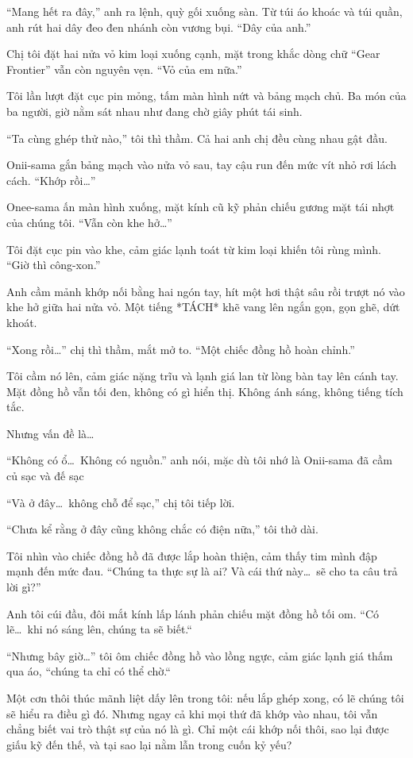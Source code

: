 \documentclass[../main.tex]{subfiles}
\begin{document}
``Mang hết ra đây,'' anh ra lệnh, quỳ gối xuống sàn. Từ túi áo khoác và túi quần, anh rút hai dây đeo đen nhánh còn vương bụi. ``Dây của anh.''

Chị tôi đặt hai nửa vỏ kim loại xuống cạnh, mặt trong khắc dòng chữ ``Gear Frontier'' vẫn còn nguyên vẹn. ``Vỏ của em nữa.''

Tôi lần lượt đặt cục pin mỏng, tấm màn hình nứt và bảng mạch chủ. Ba món của ba người, giờ nằm sát nhau như đang chờ giây phút tái sinh.

``Ta cùng ghép thử nào,'' tôi thì thầm. Cả hai anh chị đều cùng nhau gật đầu.

Onii-sama gắn bảng mạch vào nửa vỏ sau, tay cậu run đến mức vít nhỏ rơi lách cách. ``Khớp rồi\dots''

Onee-sama ấn màn hình xuống, mặt kính cũ kỹ phản chiếu gương mặt tái nhợt của chúng tôi. ``Vẫn còn khe hở\dots''

Tôi đặt cục pin vào khe, cảm giác lạnh toát từ kim loại khiến tôi rùng mình. ``Giờ thì công-xon.''

Anh cầm mảnh khớp nối bằng hai ngón tay, hít một hơi thật sâu rồi trượt nó vào khe hở giữa hai nửa vỏ. Một tiếng *TÁCH* khẽ vang lên ngắn gọn, gọn ghẽ, dứt khoát.

``Xong rồi\dots'' chị thì thầm, mắt mở to. ``Một chiếc đồng hồ hoàn chỉnh.''

Tôi cầm nó lên, cảm giác nặng trĩu và lạnh giá lan từ lòng bàn tay lên cánh tay. Mặt đồng hồ vẫn tối đen, không có gì hiển thị. Không ánh sáng, không tiếng tích tắc.

Nhưng vấn đề là\dots

``Không có ổ\dots\ Không có nguồn.'' anh nói, mặc dù tôi nhớ là Onii-sama đã cầm củ sạc và đế sạc

``Và ở đây\dots\ không chỗ để sạc,'' chị tôi tiếp lời.

``Chưa kể rằng ở đây cũng không chắc có điện nữa,'' tôi thở dài.

Tôi nhìn vào chiếc đồng hồ đã được lắp hoàn thiện, cảm thấy tim mình đập mạnh đến mức đau. ``Chúng ta thực sự là ai? Và cái thứ này\dots\ sẽ cho ta câu trả lời gì?''

Anh tôi cúi đầu, đôi mắt kính lấp lánh phản chiếu mặt đồng hồ tối om. ``Có lẽ\dots\ khi nó sáng lên, chúng ta sẽ biết.``

``Nhưng bây giờ\dots'' tôi ôm chiếc đồng hồ vào lồng ngực, cảm giác lạnh giá thấm qua áo, ``chúng ta chỉ có thể chờ.``

Một cơn thôi thúc mãnh liệt dấy lên trong tôi: nếu lắp ghép xong, có lẽ chúng tôi sẽ hiểu ra điều gì đó. Nhưng ngay cả khi mọi thứ đã khớp vào nhau, tôi vẫn chẳng biết vai trò thật sự của nó là gì. Chỉ một cái khớp nối thôi, sao lại được giấu kỹ đến thế, và tại sao lại nằm lẫn trong cuốn kỷ yếu?
\end{document}
